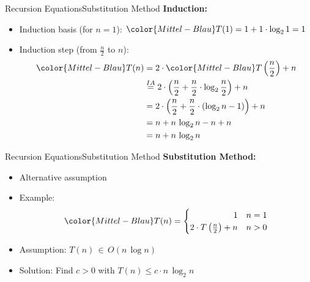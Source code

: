 
\begin{frame}{Recursion Equations}{Substitution Method}
  \textbf{Induction:}
  \begin{itemize}
    \item<2->
      Induction basis (for {\color{Mittel-Blau}$n = 1$}):
      ${\color{Mittel-Blau}T(1)} = 1 + 1 \cdot \log_2 1 = 1$
    \item<3->
      Induction step (from {\color{Mittel-Blau}$\frac{n}{2}$}
      to {\color{Mittel-Blau}$n$}):
      \begin{align*}
        {\color{Mittel-Blau}T(n)} & =
          2 \cdot {\color{Mittel-Blau}T\left(\dfrac{n}{2}\right)} + n\\
          {} & \stackrel{IA}{=} 2 \cdot \left(
            \dfrac{n}{2} + \dfrac{n}{2} \cdot \log_2 \dfrac{n}{2}
          \right) + n \\
          {} & = 2 \cdot \left(
            \dfrac{n}{2} + \dfrac{n}{2} \cdot \left(\log_2 n - 1\right)
          \right) + n\\
          {} & = n + n \, \log_2 n - n + n\\
          {} & = n + n \, \log_2 n
      \end{align*}
  \end{itemize}
\end{frame}


\begin{frame}{Recursion Equations}{Substitution Method}
  \textbf{Substitution Method:}
  \begin{itemize}
    \item<2->
      Alternative assumption
    \item<3->
      Example:
      \begin{displaymath}
        \color{Mittel-Blau}
        T(n) = \begin{cases}
          \hfill 1 & n = 1\\
          2 \cdot T\left(\frac{n}{2}\right) + n & n > 0
        \end{cases}
      \end{displaymath}
    \item<4->
      Assumption:
      {\color{Mittel-Blau}$T(n) \, \in \, O(n \, \log n)$}
    \item<5->
      Solution: Find {\color{Mittel-Blau}$c > 0$} with
      {\color{Mittel-Blau}$T(n) \leq c \cdot n \, \log_2 n$}
  \end{itemize}
\end{frame}

